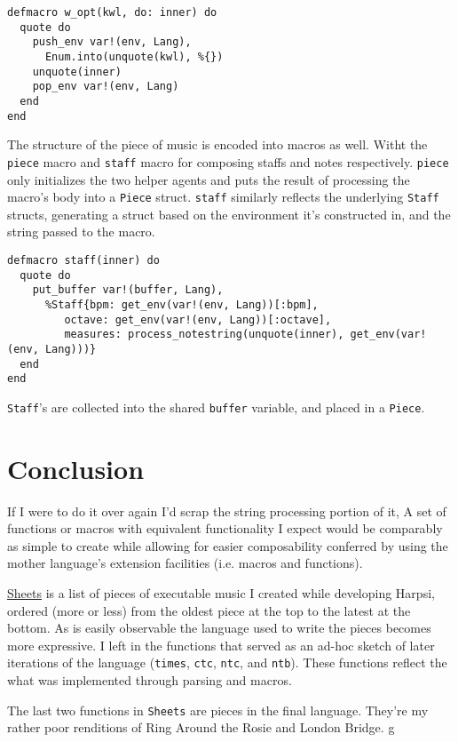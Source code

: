\documentclass[11pt]{article}
\begin{document}
\begin{verbatim}
defmacro w_opt(kwl, do: inner) do
  quote do
    push_env var!(env, Lang),
      Enum.into(unquote(kwl), %{})
    unquote(inner)
    pop_env var!(env, Lang)
  end
end
\end{verbatim}

The structure of the piece of music is encoded into macros as
well. Witht the \texttt{piece} macro and \texttt{staff} macro for composing
staffs and notes respectively. \texttt{piece} only initializes the two
helper agents and puts the result of processing the macro's body
into a \texttt{Piece} struct. \texttt{staff} similarly reflects the underlying
\texttt{Staff} structs, generating a struct based on the environment it's
constructed in, and the string passed to the macro.

\begin{verbatim}
defmacro staff(inner) do
  quote do
    put_buffer var!(buffer, Lang),
      %Staff{bpm: get_env(var!(env, Lang))[:bpm],
	     octave: get_env(var!(env, Lang))[:octave],
	     measures: process_notestring(unquote(inner), get_env(var!(env, Lang)))}
  end
end
\end{verbatim}

\texttt{Staff}'s are collected into the shared \texttt{buffer} variable, and
placed in a \texttt{Piece}.

\section{Conclusion}
\label{sec-4}
If I were to do it over again I'd scrap the string processing
portion of it, A set of functions or macros with equivalent
functionality I expect would be comparably as simple to create while
allowing for easier composability conferred by using the mother
language's extension facilities (i.e. macros and functions).

\href{lib/sheet.ex}{Sheets} is a list of pieces of executable music I created while
developing Harpsi, ordered (more or less) from the oldest piece at
the top to the latest at the bottom. As is easily observable the
language used to write the pieces becomes more expressive. I left in
the functions that served as an ad-hoc sketch of later iterations of
the language (\texttt{times}, \texttt{ctc}, \texttt{ntc}, and \texttt{ntb}). These functions
reflect the what was implemented through parsing and macros.

  The last two functions in \texttt{Sheets} are pieces in the final
  language. They're my rather poor renditions of Ring Around the Rosie
  and London Bridge.
g
\end{document}
